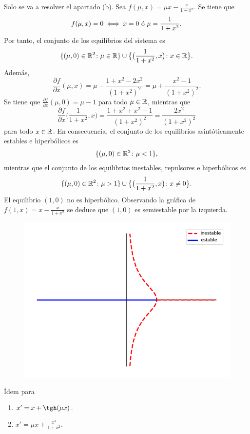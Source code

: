 \documentclass[11pt]{report}
\begin{document}
\begin{solution}
    Solo se va a resolver el apartado (b). Sea $f(\mu,x) = \mu x-\frac{x}{1+x^2}$. Se tiene que
    \begin{align*}
        f(\mu,x) = 0 \iff x = 0 \textup{ ó } \mu = \frac{1}{1+x^2}.
    \end{align*}
    Por tanto, el conjunto de los equilibrios del sistema es
    \[\{(\mu,0) \in\mathbb R^2 \colon \mu \in \mathbb R\} \cup \bigl\{\bigl(\frac{1}{1+x^2},x\bigr) \colon x \in \mathbb R\bigr\}.\]
    Además, \[\frac{\partial f}{\partial x}(\mu,x) = \mu - \frac{1+x^2-2x^2}{(1+x^2)^2} = \mu + \frac{x^2-1}{(1+x^2)^2}.\] Se tiene que $\frac{\partial f}{\partial x}(\mu, 0) = \mu-1$ para todo $\mu \in \mathbb R $, mientras que
    \[\frac{\partial f}{\partial x}\bigl(\frac{1}{1+x^2},x\bigr) = \frac{1+x^2+x^2-1}{(1+x^2)^2} = \frac{2x^2}{(1+x^2)^2}\]
    para todo $x \in \mathbb R$. En consecuencia, el conjunto de los equilibrios asintóticamente estables e hiperbólicos es
    \[\{(\mu,0) \in\mathbb R^2 \colon \mu < 1\},\]
    mientras que el conjunto de los equilibrios inestables, repulsores e hiperbólicos es
    \[\{(\mu,0) \in\mathbb R^2 \colon \mu > 1\} \cup \bigl\{\bigl(\frac{1}{1+x^2},x\bigr) \colon x \neq 0\bigr\}.\]
    El equilibrio $(1,0)$ no es hiperbólico. Observando la gráfica de $f(1,x) = x-\frac{x}{1+x^2}$ se deduce que $(1,0)$ es semiestable por la izquierda.
    \begin{figure}[H]
        \centering
        \includegraphics[scale=0.5]{img/12.png}
    \end{figure}
\end{solution}

\begin{exercise}
    Ídem para
    \begin{enumerate}
        \item $x' = x+\tgh(\mu x)$.
        \item $x' = \mu x + \frac{x^3}{1+x^2}$.
    \end{enumerate}
\end{exercise}
\end{document}
